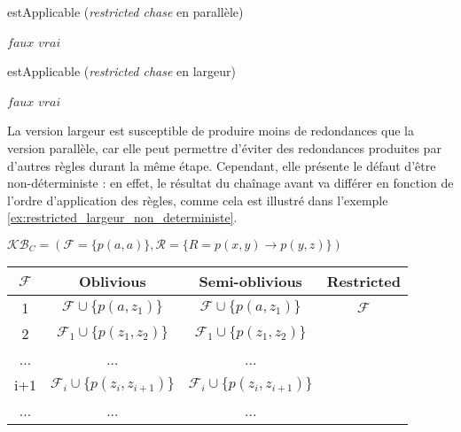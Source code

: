 \begin{algorithm}[H]\label{algo:est_applicable_restricted_parallel}
\caption{estApplicable (\textit{restricted chase} en parallèle)}
\SetAlgoLined
\DontPrintSemicolon
{}
    {
        \Return $faux$
    }
\Return $vrai$
\end{algorithm}
\begin{algorithm}[H]\label{algo:est_applicable_restricted_largeur}
\caption{estApplicable (\textit{restricted chase} en largeur)}
\SetAlgoLined
\DontPrintSemicolon
{}
    {
        \Return $faux$
    }
\Return $vrai$
\end{algorithm}

\par La version largeur est susceptible de produire moins de redondances que la version parallèle, car elle peut permettre d'éviter des redondances produites par d'autres règles durant la même étape. Cependant, elle présente le défaut d'être non-déterministe : en effet, le résultat du chaînage avant va différer en fonction de l'ordre d'application des règles, comme cela est illustré dans l'exemple \ref{ex:restricted_largeur_non_deterministe}.

\begin{example}
$\mathcal{KB}_C = (\mathcal{F} = \{p(a,a)\}, \mathcal{R} = \{R = p(x,y) \rightarrow p(y,z) \})$

\begin{center}
\begin{tabular}{|c|c|c|c|}
    \hline
    $\mathcal{F}$ & Oblivious & Semi-oblivious & Restricted \\ 
    \hline
    1 &$\mathcal{F} \cup \{p(a, z_1)\}$ & $\mathcal{F} \cup \{p(a, z_1)\} $&  $\mathcal{F}$ \\ 
    \hline
    2 &$\mathcal{F}_1 \cup \{p(z_1, z_2)\}$ &$\mathcal{F}_1 \cup \{p(z_1, z_2)\}$ & \\
    \hline
    ... & ... & ... & \\
    \hline
    i+1 & $\mathcal{F}_i \cup \{p(z_{i}, z_{i+1})\} $& $\mathcal{F}_i \cup \{p(z_{i}, z_{i+1})\} $&   \\
     \hline
     ... & ... & ... & \\
     \hline
\end{tabular}
\end{center}
\end{example}

